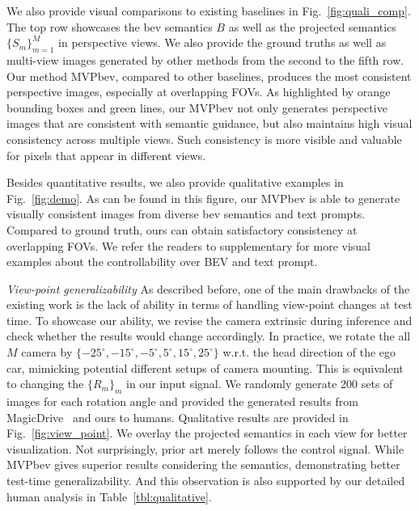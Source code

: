 We also provide visual comparisons to existing baselines in Fig.~\ref{fig:quali_comp}. The top row showcases the bev semantics $\textit{B}$ as well as the projected semantics $\{S_m\}_{m=1}^M$ in perspective views. We also provide the ground truths as well as multi-view images generated by other methods from the second to the fifth row. Our method MVPbev, compared to other baselines, produces the most consistent perspective images, especially at overlapping FOVs. As highlighted by orange bounding boxes and green lines, our MVPbev not only generates perspective images that are consistent with semantic guidance, but also maintains high visual consistency across multiple views. Such consistency is more visible and valuable for pixels that appear in different views.

Besides quantitative results, we also provide qualitative examples in Fig.~\ref{fig:demo}. As can be found in this figure, our MVPbev is able to generate visually consistent images from diverse bev semantics and text prompts. Compared to ground truth, ours can obtain satisfactory consistency at overlapping FOVs. We refer the readers to supplementary for more visual examples about the controllability over BEV and text prompt.

 \textit{View-point generalizability} As described before, one of the main drawbacks of the existing work is the lack of ability in terms of handling view-point changes at test time. 
To showcase our ability, we revise the camera extrinsic during inference and check whether the results would change accordingly. In practice, we rotate the all $M$ camera by $\{-25^{\circ},-15^{\circ},-5^{\circ},5^{\circ},15^{\circ},25^{\circ}\}$ w.r.t. the head direction of the ego car, mimicking potential different setups of camera mounting. This is equivalent to changing the $\{R_m\}_m$ in our input signal. We randomly generate 200 sets of images for each rotation angle and provided the generated results from MagicDrive~\cite{gao2023magicdrive} and ours to humans. Qualitative results are provided in Fig.~\ref{fig:view_point}. We overlay the projected semantics in each view for better visualization. Not surprisingly, prior art merely follows the control signal. While MVPbev gives superior results considering the semantics, demonstrating better test-time generalizability. And this observation is also supported by our detailed human analysis in Table~\ref{tbl:qualitative}.

